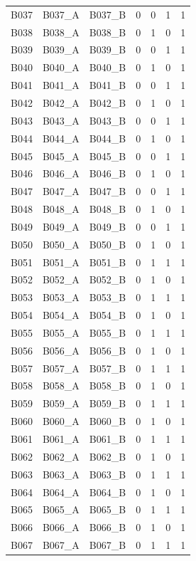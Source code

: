 \begin{table}
\begin{tabular}{lllrrrr}
B037 & B037\_A & B037\_B & 0 & 0 & 1 & 1 \\
B038 & B038\_A & B038\_B & 0 & 1 & 0 & 1 \\
B039 & B039\_A & B039\_B & 0 & 0 & 1 & 1 \\
B040 & B040\_A & B040\_B & 0 & 1 & 0 & 1 \\
B041 & B041\_A & B041\_B & 0 & 0 & 1 & 1 \\
B042 & B042\_A & B042\_B & 0 & 1 & 0 & 1 \\
B043 & B043\_A & B043\_B & 0 & 0 & 1 & 1 \\
B044 & B044\_A & B044\_B & 0 & 1 & 0 & 1 \\
B045 & B045\_A & B045\_B & 0 & 0 & 1 & 1 \\
B046 & B046\_A & B046\_B & 0 & 1 & 0 & 1 \\
B047 & B047\_A & B047\_B & 0 & 0 & 1 & 1 \\
B048 & B048\_A & B048\_B & 0 & 1 & 0 & 1 \\
B049 & B049\_A & B049\_B & 0 & 0 & 1 & 1 \\
B050 & B050\_A & B050\_B & 0 & 1 & 0 & 1 \\
B051 & B051\_A & B051\_B & 0 & 1 & 1 & 1 \\
B052 & B052\_A & B052\_B & 0 & 1 & 0 & 1 \\
B053 & B053\_A & B053\_B & 0 & 1 & 1 & 1 \\
B054 & B054\_A & B054\_B & 0 & 1 & 0 & 1 \\
B055 & B055\_A & B055\_B & 0 & 1 & 1 & 1 \\
B056 & B056\_A & B056\_B & 0 & 1 & 0 & 1 \\
B057 & B057\_A & B057\_B & 0 & 1 & 1 & 1 \\
B058 & B058\_A & B058\_B & 0 & 1 & 0 & 1 \\
B059 & B059\_A & B059\_B & 0 & 1 & 1 & 1 \\
B060 & B060\_A & B060\_B & 0 & 1 & 0 & 1 \\
B061 & B061\_A & B061\_B & 0 & 1 & 1 & 1 \\
B062 & B062\_A & B062\_B & 0 & 1 & 0 & 1 \\
B063 & B063\_A & B063\_B & 0 & 1 & 1 & 1 \\
B064 & B064\_A & B064\_B & 0 & 1 & 0 & 1 \\
B065 & B065\_A & B065\_B & 0 & 1 & 1 & 1 \\
B066 & B066\_A & B066\_B & 0 & 1 & 0 & 1 \\
B067 & B067\_A & B067\_B & 0 & 1 & 1 & 1 \\

\end{tabular}
\end{table}
